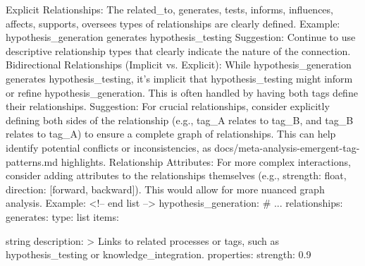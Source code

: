 {Explicit Relationships: The related_to, generates, tests, informs, influences, affects, supports, oversees types of relationships are clearly defined.
Example: hypothesis_generation generates hypothesis_testing
Suggestion: Continue to use descriptive relationship types that clearly indicate the nature of the connection.
Bidirectional Relationships (Implicit vs. Explicit): While hypothesis_generation generates hypothesis_testing, it's implicit that hypothesis_testing might inform or refine hypothesis_generation. This is often handled by having both tags define their relationships.
Suggestion: For crucial relationships, consider explicitly defining both sides of the relationship (e.g., tag_A relates to tag_B, and tag_B relates to tag_A) to ensure a complete graph of relationships. This can help identify potential conflicts or inconsistencies, as docs/meta-analysis-emergent-tag-patterns.md highlights.
Relationship Attributes: For more complex interactions, consider adding attributes to the relationships themselves (e.g., strength: float, direction: [forward, backward]). This would allow for more nuanced graph analysis.
Example:
<!-- end list -->
hypothesis_generation:
# ...
relationships:
generates:
 type: list
 items:

string description: > Links to related processes or tags, such as hypothesis_testing or knowledge_integration. properties: strength: 0.9

}
